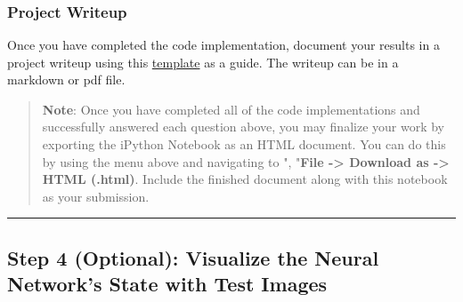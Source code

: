 \documentclass[11pt]{article}
\begin{document}
    \begin{center}
    \end{center}
    { \hspace*{\fill} \\}
    
    \begin{center}
    \end{center}
    { \hspace*{\fill} \\}
    
    \begin{center}
    \end{center}
    { \hspace*{\fill} \\}
    
    \subsubsection{Project Writeup}\label{project-writeup}

Once you have completed the code implementation, document your results
in a project writeup using this
\href{https://github.com/udacity/CarND-Traffic-Sign-Classifier-Project/blob/master/writeup_template.md}{template}
as a guide. The writeup can be in a markdown or pdf file.

    \begin{quote}
\textbf{Note}: Once you have completed all of the code implementations
and successfully answered each question above, you may finalize your
work by exporting the iPython Notebook as an HTML document. You can do
this by using the menu above and navigating to \n", "\textbf{File
-\textgreater{} Download as -\textgreater{} HTML (.html)}. Include the
finished document along with this notebook as your submission.
\end{quote}

    \begin{center}\rule{0.5\linewidth}{\linethickness}\end{center}

\subsection{Step 4 (Optional): Visualize the Neural Network's State with
Test
Images}\label{step-4-optional-visualize-the-neural-networks-state-with-test-images}
\end{document}
